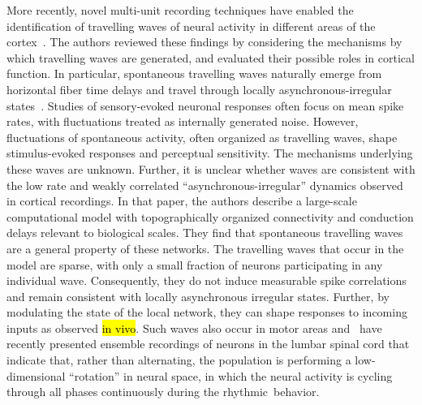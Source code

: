 \documentclass[brainsci, %
               review,accept,pdftex,moreauthors
               ]{Definitions/mdpi}
\begin{document}
More recently, novel multi-unit recording techniques have enabled the identification of travelling waves of neural activity in different areas of the cortex~\citep{muller_cortical_2018}. The authors reviewed these findings by considering the mechanisms by which travelling waves are generated, and evaluated their possible roles in cortical function. In particular, spontaneous travelling waves naturally emerge from horizontal fiber time delays and travel through locally asynchronous-irregular states~\citep{davis_spontaneous_2021}. Studies of sensory-evoked neuronal responses often focus on mean spike rates, with fluctuations treated as internally generated noise. However, fluctuations of spontaneous activity, often organized as travelling waves, shape stimulus-evoked responses and perceptual sensitivity. The mechanisms underlying these waves are unknown. Further, it is unclear whether waves are consistent with the low rate and weakly correlated ``asynchronous-irregular'' dynamics observed in cortical recordings. In that paper, the authors describe a large-scale computational model with topographically organized connectivity and conduction delays relevant to biological scales. They find that spontaneous travelling waves are a general property of these networks. The travelling waves that occur in the model are sparse, with only a small fraction of neurons participating in any individual wave. Consequently, they do not induce measurable spike correlations and remain consistent with locally asynchronous irregular states. Further, by modulating the state of the local network, they can shape responses to incoming inputs as observed {\hl{in vivo}}. %
Such waves also occur in motor areas and~\citet{linden_movement_2022} have recently presented ensemble recordings of neurons in the lumbar spinal cord that indicate that, rather than alternating, the population is performing a low-dimensional ``rotation'' in neural space, in which the neural activity is cycling through all phases continuously during the rhythmic~behavior.
\end{document}
